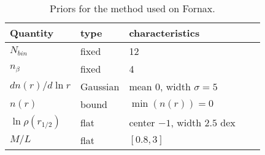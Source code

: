\begin{table}
  \label{tab:priors}
  \caption{Priors for the \GravImage method used on Fornax.}
  \centering
  \begin{tabular}{lllll}
    Quantity & type & characteristics \\
    \hline
    $N_{bin}$ & fixed & 12\\
    $n_\beta$ & fixed & 4\\
    $dn(r)/d\ln r$ & Gaussian & mean 0, width $\sigma=5$\\
    $n(r)$ & bound & $\min(n(r))=0$\\
    $\ln \rho(r_{1/2})$ & flat & center $-1$, width $2.5$ dex\\
    $M/L$ & flat & $[0.8, 3]$
  \end{tabular}
\end{table}



